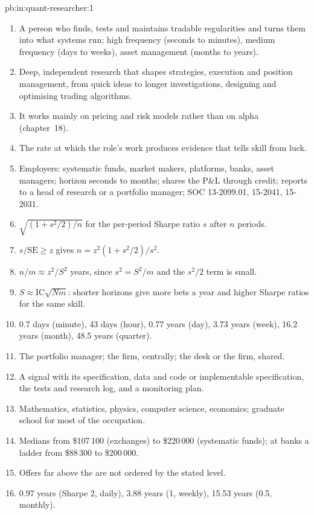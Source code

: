 \begin{solution}{pb:in:quant-researcher:1}
\begin{enumerate}
\item A person who finds, tests and maintains tradable regularities and turns them into what systems run; high frequency
(seconds to minutes), medium frequency (days to weeks), asset management (months to years).
\item Deep, independent research that shapes strategies, execution and position management, from quick ideas to longer
investigations, designing and optimising trading algorithms.
\item It works mainly on pricing and risk models rather than on alpha (chapter~18).
\item The rate at which the role's work produces evidence that tells skill from luck.
\item Employers: systematic funds, market makers, platforms, banks, asset managers; horizon seconds to months; shares the
P\&L through credit; reports to a head of research or a portfolio manager; SOC 13-2099.01, 15-2041, 15-2031.
\item $\sqrt{(1+s^2/2)/n}$ for the per-period Sharpe ratio $s$ after $n$ periods.
\item $s/\mathrm{SE}\ge z$ gives $n=z^2(1+s^2/2)/s^2$.
\item $n/m\approx z^2/S^2$ years, since $s^2=S^2/m$ and the $s^2/2$ term is small.
\item $S\approx\mathrm{IC}\sqrt{Nm}$: shorter horizons give more bets a year and higher Sharpe ratios for the same skill.
\item 0.7 days (minute), 43 days (hour), 0.77 years (day), 3.73 years (week), 16.2 years (month), 48.5 years (quarter).
\item The portfolio manager; the firm, centrally; the desk or the firm, shared.
\item A signal with its specification, data and code or implementable specification, the tests and research log, and a
monitoring plan.
\item Mathematics, statistics, physics, computer science, economics; graduate school for most of the occupation.
\item Medians from \$107\,100 (exchanges) to \$220\,000 (systematic funds); at banks a ladder from \$88\,300 to \$200\,000.
\item Offers far above the  are not ordered by the stated level.
\item 0.97 years (Sharpe 2, daily), 3.88 years (1, weekly), 15.53 years (0.5, monthly).

\end{enumerate}
\end{solution}
